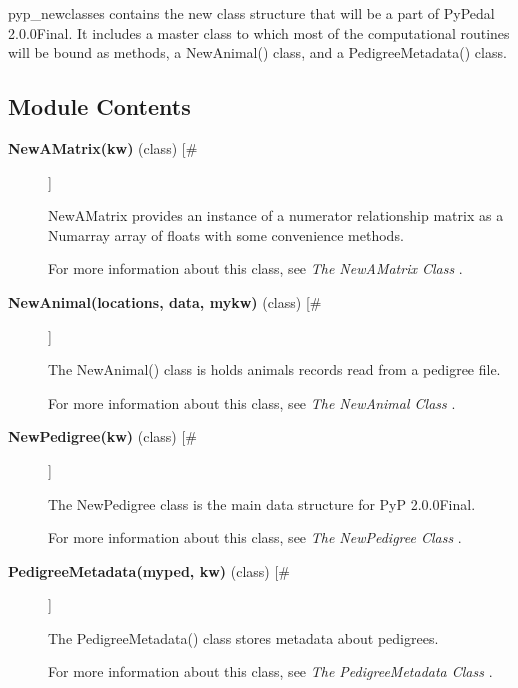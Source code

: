 

 pyp\_newclasses contains the new class structure that will be a part of PyPedal 2.0.0Final. It includes a master class to which most of the computational routines will be bound as methods, a NewAnimal() class, and a PedigreeMetadata() class.
\subsection*{Module Contents}
\begin{description}
\item[\textbf{NewAMatrix(kw)}
 (class) [\#]]

 NewAMatrix provides an instance of a numerator relationship matrix as a Numarray array of floats with some convenience methods.


 For more information about this class, see \emph{The NewAMatrix Class}
.

\item[\textbf{NewAnimal(locations, data, mykw)}
 (class) [\#]]

 The NewAnimal() class is holds animals records read from a pedigree file.


 For more information about this class, see \emph{The NewAnimal Class}
.

\item[\textbf{NewPedigree(kw)}
 (class) [\#]]

 The NewPedigree class is the main data structure for PyP 2.0.0Final.


 For more information about this class, see \emph{The NewPedigree Class}
.

\item[\textbf{PedigreeMetadata(myped, kw)}
 (class) [\#]]

 The PedigreeMetadata() class stores metadata about pedigrees.


 For more information about this class, see \emph{The PedigreeMetadata Class}
.


\end{description}
